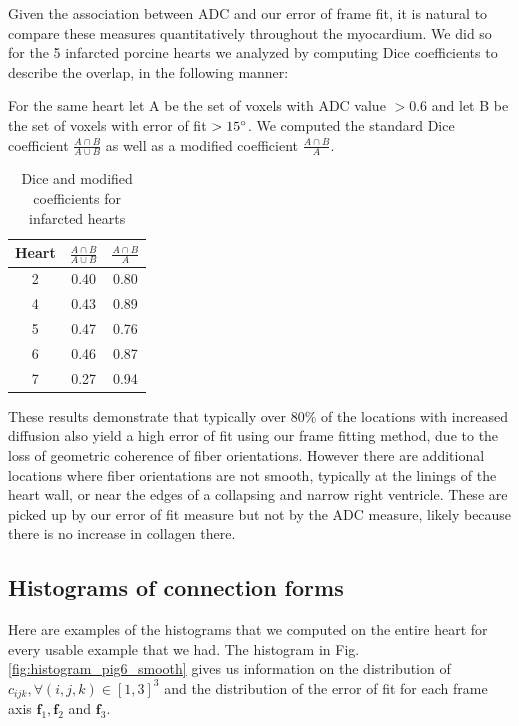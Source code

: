 Given the association between ADC and our error of frame fit, it is natural to compare these measures quantitatively throughout the myocardium. We did so for the 5 infarcted porcine hearts we analyzed by computing Dice coefficients to describe the overlap, in the following manner:

For the same heart let A be the set of voxels with ADC value $> 0.6$ and let B be the set of voxels with error of fit $> 15 ^{\circ}$. We computed the standard Dice coefficient $\frac{A \cap B}{A \cup B}$ as well as a modified coefficient $\frac{A \cap B}{A}$.
\begin{table}
    \centering
    \begin{tabular}{|c | c | c |}
         \hline
         Heart & $\frac{A \cap B}{A \cup B}$ & $\frac{A \cap B}{A}$ \\
         \hline
         2 & 0.40 & 0.80 \\ 
         \hline
         4 & 0.43 & 0.89 \\
         \hline
         5 & 0.47 & 0.76 \\
         \hline
         6 & 0.46 & 0.87 \\
         \hline
         7 & 0.27 & 0.94 \\ 
         \hline
    \end{tabular}
    \caption{Dice and modified coefficients for infarcted hearts}
\end{table}

These results demonstrate that typically over 80\% of the locations with increased diffusion also yield a high error of fit using our frame fitting method, due to the loss of geometric coherence of fiber orientations. However there are additional locations where fiber orientations are not smooth, typically at the linings of the heart wall, or near the edges of a collapsing and narrow right ventricle. These are picked up by our error of fit measure but not by the ADC measure, likely because there is no increase in collagen there.

\subsection{Histograms of connection forms} \label{histogram_section}

Here are examples of the histograms that we computed on the entire heart for every usable example that we had. The histogram in Fig. \ref{fig:histogram_pig6_smooth} gives us information on the distribution of $c_{ijk}, \forall (i, j, k) \in [1, 3]^3$ and the distribution of the error of fit for each frame axis $\mathbf{f}_1, \mathbf{f}_2$ and $\mathbf{f}_3$.

